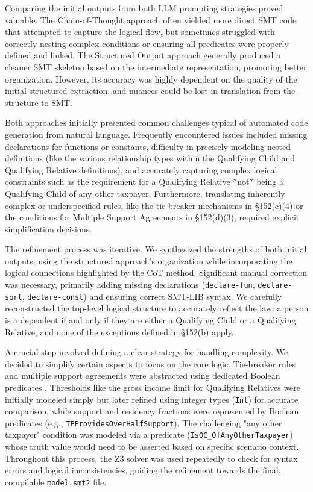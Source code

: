 \documentclass[11pt, letterpaper]{article}
\begin{document}
Comparing the initial outputs from both LLM prompting strategies proved valuable. The Chain-of-Thought approach often yielded more direct SMT code that attempted to capture the logical flow, but sometimes struggled with correctly nesting complex conditions or ensuring all predicates were properly defined and linked. The Structured Output approach generally produced a cleaner SMT skeleton based on the intermediate representation, promoting better organization. However, its accuracy was highly dependent on the quality of the initial structured extraction, and nuances could be lost in translation from the structure to SMT.

Both approaches initially presented common challenges typical of automated code generation from natural language. Frequently encountered issues included missing declarations for functions or constants, difficulty in precisely modeling nested definitions (like the various relationship types within the Qualifying Child and Qualifying Relative definitions), and accurately capturing complex logical constraints such as the requirement for a Qualifying Relative *not* being a Qualifying Child of any other taxpayer. Furthermore, translating inherently complex or underspecified rules, like the tie-breaker mechanisms in §152(c)(4) or the conditions for Multiple Support Agreements in §152(d)(3), required explicit simplification decisions.

The refinement process was iterative. We synthesized the strengths of both initial outputs, using the structured approach's organization while incorporating the logical connections highlighted by the CoT method. Significant manual correction was necessary, primarily adding missing declarations (\texttt{declare-fun}, \texttt{declare-sort}, \texttt{declare-const}) and ensuring correct SMT-LIB syntax. We carefully reconstructed the top-level logical structure to accurately reflect the law: a person is a dependent if and only if they are either a Qualifying Child or a Qualifying Relative, and none of the exceptions defined in §152(b) apply.

A crucial step involved defining a clear strategy for handling complexity. We decided to simplify certain aspects to focus on the core logic. Tie-breaker rules and multiple support agreements were abstracted using dedicated Boolean predicates . Thresholds like the gross income limit for Qualifying Relatives were initially modeled simply but later refined using integer types (\texttt{Int}) for accurate comparison, while support and residency fractions were represented by Boolean predicates (e.g., \texttt{TPProvidesOverHalfSupport}). The challenging "any other taxpayer" condition was modeled via a predicate (\texttt{IsQC\_OfAnyOtherTaxpayer}) whose truth value would need to be asserted based on specific scenario context. Throughout this process, the Z3 solver was used repeatedly to check for syntax errors and logical inconsistencies, guiding the refinement towards the final, compilable \texttt{model.smt2} file.
\end{document}
